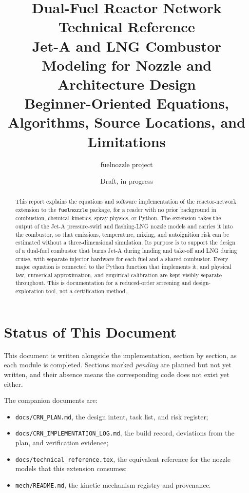 \documentclass[11pt]{article}
\title{Dual-Fuel Reactor Network Technical Reference\\
\large Jet-A and LNG Combustor Modeling for Nozzle and Architecture Design\\
\large Beginner-Oriented Equations, Algorithms, Source Locations, and Limitations}
\author{fuelnozzle project}
\date{Draft, in progress}
\newcommand{\code}[1]{\nolinkurl{#1}}
\begin{document}
\maketitle

\begin{abstract}
This report explains the equations and software implementation of the reactor-network
extension to the \code{fuelnozzle} package, for a reader with no prior background in
combustion, chemical kinetics, spray physics, or Python. The extension takes the output
of the Jet-A pressure-swirl and flashing-LNG nozzle models and carries it into the
combustor, so that emissions, temperature, mixing, and autoignition risk can be estimated
without a three-dimensional simulation. Its purpose is to support the design of a
dual-fuel combustor that burns Jet-A during landing and take-off and LNG during cruise,
with separate injector hardware for each fuel and a shared combustor. Every major
equation is connected to the Python function that implements it, and physical law,
numerical approximation, and empirical calibration are kept visibly separate throughout.
This is documentation for a reduced-order screening and design-exploration tool, not a
certification method.
\end{abstract}

\tableofcontents
\newpage

\section{Status of This Document}

This document is written alongside the implementation, section by section, as each
module is completed. Sections marked \emph{pending} are planned but not yet written,
and their absence means the corresponding code does not exist yet either.

The companion documents are:

\begin{itemize}
  \item \code{docs/CRN_PLAN.md}, the design intent, task list, and risk register;
  \item \code{docs/CRN_IMPLEMENTATION_LOG.md}, the build record, deviations from the
        plan, and verification evidence;
  \item \code{docs/technical_reference.tex}, the equivalent reference for the nozzle
        models that this extension consumes;
  \item \code{mech/README.md}, the kinetic mechanism registry and provenance.
\end{itemize}
\end{document}
